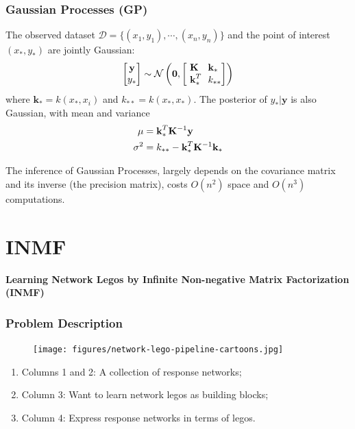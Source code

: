 \documentclass{beamer}
\newcommand{\bk}{\textbf{k}}
\newcommand{\by}{\textbf{y}}
\newcommand{\K}{{\bf K}}
\newcommand{\DD}{{\mathcal D}}
\newcommand{\NN}{{\mathcal N}}
\begin{document}
\begin{frame}
\frametitle{Gaussian Processes (GP)}
The observed dataset $\DD = \{(x_1,y_1),\cdots,(x_n,y_n)\}$ and the point of interest $(x_*,y_*)$ are jointly Gaussian:
\begin{align}
	\begin{bmatrix}\by\\y_*\end{bmatrix} \sim \NN \left( \mathbf{0}, \begin{bmatrix}\K ~~~ \bk_*\\~\bk_*^T ~~k_{**}\end{bmatrix} \right)
\end{align}
where $\bk_* = k(x_*,x_i)$ and $k_{**} = k(x_*,x_*)$. The posterior of $y_*|\by$ is also Gaussian, with mean and variance
\begin{align}
	\mu &= \bk_*^T\K^{-1}\by\\
	\sigma^2 &= k_{**} - \bk_*^T\K^{-1}\bk_*
\end{align}

The inference of Gaussian Processes, largely depends on the covariance matrix and its inverse (the precision matrix), costs $O(n^2)$ space and $O(n^3)$ computations.
\end{frame}



\section{INMF}

\begin{frame}
\begin{center}
{\bf{Learning Network Legos by Infinite Non-negative Matrix Factorization (INMF)}}
\end{center}
\end{frame}

\begin{frame}
\frametitle{Problem Description}

\begin{figure}[c]
  \texttt{[image: figures/network-lego-pipeline-cartoons.jpg]}
\end{figure}

\begin{enumerate}
	\item Columns 1 and 2: A collection of response networks;
    \item Column 3: Want to learn network legos as building blocks;
    \item Column 4: Express response networks in terms of legos.
\end{enumerate}

\end{frame}
\end{document}
